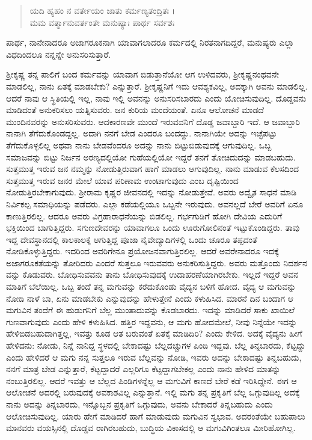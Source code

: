 \begin{verse}
ಯದಿ ಹ್ಯಹಂ ನ ವರ್ತೇಯಂ ಜಾತು ಕರ್ಮಣ್ಯತಂದ್ರಿತಃ ।\\ಮಮ ವರ್ತ್ಮಾನುವರ್ತಂತೇ ಮನುಷ್ಯಾಃ ಪಾರ್ಥ ಸರ್ವಶಃ 
\end{verse}

{\small ಪಾರ್ಥ, ನಾನೇನಾದರೂ ಅಜಾಗರೂಕನಾಗಿ ಯಾವಾಗಲಾದರೂ ಕರ್ಮದಲ್ಲಿ ನಿರತನಾಗದಿದ್ದರೆ, ಮನುಷ್ಯರು ಎಲ್ಲಾ ವಿಧದಿಂದಲೂ ನನ್ನನ್ನೇ ಅನುಸರಿಸುತ್ತಾರೆ.}

ಶ್ರೀಕೃಷ್ಣ ತನ್ನ ಪಾಲಿಗೆ ಬಂದ ಕರ್ಮವನ್ನು ಯಾವಾಗ ಬಿಡುತ್ತಾನೆಯೋ ಆಗ ಉಳಿದವರು, ಶ್ರೀಕೃಷ್ಣನಂಥವನೇ ಮಾಡಲಿಲ್ಲ, ನಾನು ಏತಕ್ಕೆ ಮಾಡಬೇಕು? ಎನ್ನುತ್ತಾರೆ. ಶ್ರೀಕೃಷ್ಣನಿಗೆ ಇದು ಆವಶ್ಯಕವಿಲ್ಲ, ಅದಕ್ಕಾಗಿ ಅವನು ಮಾಡಲಿಲ್ಲ. ಆದರೆ ನಾವು ಆ ಸ್ಥಿತಿಯಲ್ಲಿ ಇಲ್ಲ, ನಾವು ಇಲ್ಲಿ ಅವನನ್ನು ಅನುಸರಿಸಬಾರದು ಎಂದು ಯೋಚಿಸುವುದಿಲ್ಲ. ದೊಡ್ಡವನು ಮಾಡಿದಂತೆ ಅನುಕರಿಸಲು ಯತ್ನಿಸುವರು. ಜನ ಕುರಿಯ ಮಂದೆಯಂತೆ. ಏನೂ ಆಲೋಚನೆ ಮಾಡದೆ ಮುಂದಿನವರನ್ನು ಅನುಸರಿಸುವರು. ಆದಕಾರಣವೇ ಮುಂದೆ ಇರುವವನಿಗೆ ದೊಡ್ಡ ಜವಾಬ್ದಾರಿ ಇದೆ. ಆ ಜವಾಬ್ದಾರಿ ನಾನಾಗಿ ತೆಗೆದುಕೊಂಡದ್ದಲ್ಲ. ಅದಾಗಿ ನನಗೆ ಬೇಡ ಎಂದರೂ ಬಂದದ್ದು. ನಾನಾಗಿಯೇ ಅದನ್ನು ಇಚ್ಛೆಪಟ್ಟು ತೆಗೆದುಕೊಳ್ಳಲಿಲ್ಲ ಅಥವಾ ನಾನು ಬೇಡವೆಂದರೂ ಅದನ್ನು ನಾನು ಬಿಟ್ಟುಬಿಡುವುದಕ್ಕೆ ಆಗುವುದಿಲ್ಲ. ಒಬ್ಬ ಸಮಾಜವನ್ನು ಬಿಟ್ಟು ನಿರ್ಜನ ಅರಣ್ಯದಲ್ಲಿಯೋ ಗುಹೆಯಲ್ಲಿಯೋ ಇದ್ದರೆ ತನಗೆ ತೋಚಿದುದನ್ನು ಮಾಡಬಹುದು. ಸುತ್ತಮುತ್ತ ಇರುವ ಜನ ನಮ್ಮನ್ನು ನೋಡುತ್ತಿರುವಾಗ ಹಾಗೆ ಮಾಡಲು ಆಗುವುದಿಲ್ಲ. ನಾನು ಮಾಡುವ ಕೆಲಸದಿಂದ ಸುತ್ತಮುತ್ತ ಇರುವ ಜನರ ಮೇಲೆ ಯಾವ ಪರಿಣಾಮ ಉಂಟಾಗುವುದು ಎಂಬ ದೃಷ್ಟಿಯಿಂದ ನೋಡುತ್ತಿರಬೇಕಾಗುವುದು. ಶ್ರೀರಾಮ ಕೃಷ್ಣರ ಜೀವನದಲ್ಲಿ ಇದನ್ನು ನೋಡುತ್ತೇವೆ. ಅವರು ಅದ್ವೈತ ಸಾಧನೆ ಮಾಡಿ ನಿರ್ವಿಕಲ್ಪ ಸಮಾಧಿಯನ್ನು ಪಡೆದರು. ಎಲ್ಲಾ ಕಡೆಯಲ್ಲಿಯೂ ಒಬ್ಬನೇ ಇರುವುದು. ಅವನಲ್ಲದೆ ಬೇರೆ ಅವರಿಗೆ ಏನೂ ಕಾಣುತ್ತಿರಲಿಲ್ಲ. ಆದರೂ ಅವರು ವಿಗ್ರಹಾರಾಧನೆಯನ್ನು ಬಿಡಲಿಲ್ಲ. ಗರ್ಭಗುಡಿಗೆ ಹೋಗಿ ದೇವಿಯ ಎದುರಿಗೆ ಭಕ್ತಿಯಿಂದ ಬಾಗುತ್ತಿದ್ದರು. ಸಗುಣದೇವರನ್ನು ಯಾವಾಗಲೂ ಒಂದು ಊರುಗೋಲಿನಂತೆ ಇಟ್ಟುಕೊಂಡಿದ್ದರು. ತಾವು ಇದ್ದ ದೇವಸ್ಥಾನದಲ್ಲಿ ಕಾಲಕಾಲಕ್ಕೆ ಆಗುತ್ತಿದ್ದ ಪೂಜಾ ನೈವೇದ್ಯಾದಿಗಳಲ್ಲಿ ಒಂದು ಚೂರೂ ತಪ್ಪದಂತೆ ನೋಡಿಕೊಳ್ಳುತ್ತಿದ್ದರು. ಇದರಿಂದ ಅವರಿಗೇನೂ ಪ್ರಯೋಜನವಾಗುತ್ತಿರಲಿಲ್ಲ. ಆದರೆ ಅವರೇನಾದರೂ ಇದಕ್ಕೆ ಅಜಾಗರೂಕತೆಯನ್ನು ತೋರಿದರು ಎಂದರೆ ಸುತ್ತಲೂ ಇರುವವರು ಅನುಕರಿಸುತ್ತಿದ್ದರು. ಅವರು ಮತ್ತೊಂದು ನಿದರ್ಶನ ವನ್ನು ಕೊಡುವರು. ಬೋಧಿಸುವವನು ತಾನು ಬೋಧಿಸುವುದಕ್ಕೆ ಉದಾಹರಣೆಯಾಗಿರಬೇಕು. ಇಲ್ಲದೆ ಇದ್ದರೆ ಅವನ ಮಾತಿಗೆ ಬೆಲೆಯಿಲ್ಲ. ಒಬ್ಬ ತಂದೆ ತನ್ನ ಮಗುವನ್ನು ಕರೆದುಕೊಂಡು ವೈದ್ಯನ ಬಳಿಗೆ ಹೋದ. ವೈದ್ಯ ಆ ಮಗುವನ್ನು ನೋಡಿ ನಾಳೆ ಬಾ, ಏನು ಮಾಡಬೇಕು ಎನ್ನುವುದನ್ನು ಹೇಳುತ್ತೇನೆ ಎಂದು ಕಳುಹಿಸಿದ. ಮಾರನೆ ದಿನ ಬಂದಾಗ ಆ ಮಗುವಿನ ತಂದೆಗೆ ಈ ಹುಡುಗನಿಗೆ ಬೆಲ್ಲ ಮುಂತಾದುವನ್ನು ಕೊಡಬಾರದು. ಇದನ್ನು ಮಾಡಿದರೆ ಸಾಕು ಖಾಯಿಲೆ ಗುಣವಾಗುವುದು ಎಂದು ಹೇಳಿ ಕಳುಹಿಸಿದ. ಹತ್ತಿರ ಇದ್ದವನು, ಆ ಮಗು ಹೋದಮೇಲೆ, ನೀವು ನಿನ್ನೆಯೇ ಇದನ್ನು ಹೇಳಿಬಿಡಬಹುದಾಗಿತ್ತಲ್ಲ, ಇವತ್ತು ಕೂಡ ಆತ ಬರುವಂತೆ ಏತಕ್ಕೆ ಮಾಡಿದಿರಿ? ಎಂದು ಕೇಳಿದ. ಅದಕ್ಕೆ ವೈದ್ಯನು ಹೀಗೆ ಹೇಳಿದನು: ನೋಡು, ನಿನ್ನೆ ನಾನಿದ್ದ ಸ್ಥಳದಲ್ಲಿ ಬೇಕಾದಷ್ಟು ಬೆಲ್ಲದಚ್ಚುಗಳ ಪಿಂಡಿ ಇದ್ದವು. ಬೆಲ್ಲ ತಿನ್ನಬಾರದು, ಕೆಟ್ಟದ್ದು ಎಂದು ಹೇಳಿದರೆ ಆ ಮಗು ನನ್ನ ಸುತ್ತಲೂ ಇರುವ ಬೆಲ್ಲವನ್ನು ನೋಡಿ, ಇವರು ಅದನ್ನು ಬೇಕಾದಷ್ಟು ತಿನ್ನಬಹುದು, ನನಗೆ ಮಾತ್ರ ಬೇಡ ಎನ್ನುತ್ತಾರೆ, ಕೆಟ್ಟದ್ದಾದರೆ ಎಲ್ಲರಿಗೂ ಕೆಟ್ಟದ್ದಾಗಬೇಕಲ್ಲ ಎಂದು ನಾನು ಹೇಳಿದ ಮಾತನ್ನು ನಂಬುತ್ತಿರಲಿಲ್ಲ. ಆದರೆ ಇವತ್ತು ಆ ಬೆಲ್ಲದ ಪಿಂಡಿಗಳನ್ನೆಲ್ಲ ಆ ಮಗುವಿಗೆ ಕಾಣದೆ ಬೇರೆ ಕಡೆ ಇರಿಸಿದ್ದೇನೆ. ಈಗ ಆ ಆಲೋಚನೆ ಅದರಲ್ಲಿ ಬರುವುದಕ್ಕೆ ಅವಕಾಶವಿಲ್ಲ ಎನ್ನುತ್ತಾನೆ. ಇಲ್ಲಿ ಮಗು ತನ್ನ ಪ್ರಕೃತಿಗೆ ಬೆಲ್ಲ ಒಗ್ಗುವುದಿಲ್ಲ ಅದಕ್ಕೆ ನಾನು ಅದನ್ನು ತಿನ್ನಬಾರದು, ಇನ್ನೊಬ್ಬನ ಪ್ರಕೃತಿಗೆ ಒಗ್ಗುವುದು, ಅವನು ಬೇಕಾದರೆ ತಿನ್ನಬಹುದು ಎಂದು ಆಲೋಚಿಸುವುದಿಲ್ಲ. ಯಾರು ಹೇಗೆ ಮಾಡಿದರೆ ಹಾಗೆ ಮಾಡುವುದು ಮಗುವಿನ ಸ್ವಭಾವ. ಅದರಂತೆಯೇ ಬಹುಪಾಲು ಮಾನವರು ವಯಸ್ಸಿನಲ್ಲಿ ದೊಡ್ಡವ ರಾಗಿರಬಹುದು, ಬುದ್ಧಿಯ ವಿಕಾಸದಲ್ಲಿ ಆ ಮಗುವಿಗಿಂತಲೂ ಮೀರಿಹೋಗಿಲ್ಲ.

